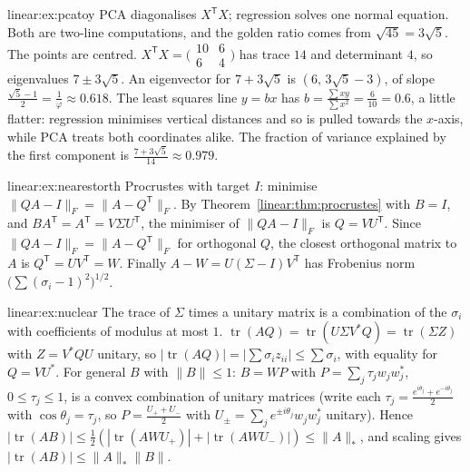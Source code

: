 \begin{solution}{linear:ex:pcatoy}
\idea PCA diagonalises $X^{\mathsf T}X$; regression solves one normal equation. Both are two-line computations, and the
golden ratio comes from $\sqrt{45}=3\sqrt5$.
\writeup The points are centred. $X^{\mathsf T}X=\bigl(\begin{smallmatrix}10&6\\6&4\end{smallmatrix}\bigr)$ has trace $14$ and
determinant $4$, so eigenvalues $7\pm3\sqrt5$. An eigenvector for $7+3\sqrt5$ is $(6,\,3\sqrt5-3)$, of slope $\frac{\sqrt5-1}2=
\frac1\varphi\approx0.618$. The least squares line $y=bx$ has $b=\frac{\sum xy}{\sum x^2}=\frac6{10}=0.6$, a little flatter:
regression minimises vertical distances and so is pulled towards the $x$-axis, while PCA treats both coordinates alike. The
fraction of variance explained by the first component is $\frac{7+3\sqrt5}{14}\approx0.979$.
\end{solution}

\begin{solution}{linear:ex:nearestorth}
\idea Procrustes with target $I$: minimise $\|QA-I\|_F=\|A-Q^{\mathsf T}\|_F$.
\writeup By Theorem~\ref{linear:thm:procrustes} with $B=I$, and $BA^{\mathsf T}=A^{\mathsf T}=V\Sigma U^{\mathsf T}$, the minimiser of
$\|QA-I\|_F$ is $Q=VU^{\mathsf T}$. Since $\|QA-I\|_F=\|A-Q^{\mathsf T}\|_F$ for orthogonal $Q$, the closest orthogonal matrix to
$A$ is $Q^{\mathsf T}=UV^{\mathsf T}=W$. Finally $A-W=U(\Sigma-I)V^{\mathsf T}$ has Frobenius norm $\bigl(\sum(\sigma_i-1)^2\bigr)^{1/2}$.
\end{solution}

\begin{solution}{linear:ex:nuclear}
\idea The trace of $\Sigma$ times a unitary matrix is a combination of the $\sigma_i$ with coefficients of modulus at most $1$.
\writeup $\operatorname{tr}(AQ)=\operatorname{tr}(U\Sigma V^*Q)=\operatorname{tr}(\Sigma Z)$ with $Z=V^*QU$ unitary, so
$|\operatorname{tr}(AQ)|=|\sum\sigma_iz_{ii}|\le\sum\sigma_i$, with equality for $Q=VU^*$. For general $B$ with $\|B\|\le1$:
$B=W P$ with $P=\sum_j\tau_jw_jw_j^*$, $0\le\tau_j\le1$, is a convex combination of unitary matrices (write each $\tau_j=
\frac{e^{i\theta_j}+e^{-i\theta_j}}2$ with $\cos\theta_j=\tau_j$, so $P=\frac{U_++U_-}2$ with $U_\pm=\sum_je^{\pm i\theta_j}w_jw_j^*$
unitary). Hence $|\operatorname{tr}(AB)|\le\frac12(|\operatorname{tr}(AWU_+)|+|\operatorname{tr}(AWU_-)|)\le\|A\|_*$, and scaling
gives $|\operatorname{tr}(AB)|\le\|A\|_*\|B\|$.
\end{solution}

